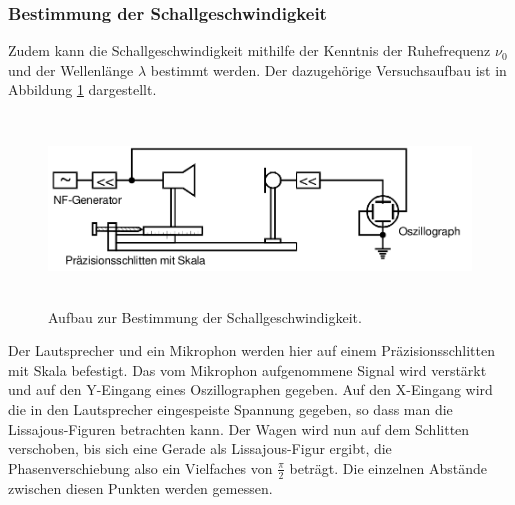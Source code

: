 \subsubsection{Bestimmung der Schallgeschwindigkeit}
\label{sec:schall}
Zudem kann die Schallgeschwindigkeit mithilfe der Kenntnis der Ruhefrequenz $\nu_0$ und der Wellenlänge $\lambda$ bestimmt werden.
Der dazugehörige Versuchsaufbau ist in Abbildung \ref{tfig:4} dargestellt.
\begin{figure}
  \centering
  \includegraphics[height=5cm]{aufbau4.png}
  \caption{Aufbau zur Bestimmung der Schallgeschwindigkeit.}
  \label{tfig:4}
\end{figure}
Der Lautsprecher und ein Mikrophon werden hier auf einem Präzisionsschlitten mit Skala befestigt. Das vom Mikrophon aufgenommene Signal wird verstärkt und auf den Y-Eingang eines Oszillographen gegeben.
Auf den X-Eingang wird die in den Lautsprecher eingespeiste Spannung gegeben, so dass man die Lissajous-Figuren betrachten kann.
Der Wagen wird nun auf dem Schlitten verschoben, bis sich eine Gerade als Lissajous-Figur ergibt, die Phasenverschiebung also ein Vielfaches von $\frac{\pi}{2}$ beträgt.
Die einzelnen Abstände zwischen diesen Punkten werden gemessen.
